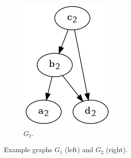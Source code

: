 \begin{frame}
\begin{figure}[htbp]
\begin{subfigure}[t]{0.19\textwidth}
			\includegraphics[width=\linewidth,valign=t]{inc/fuzzy_graph_theory/fuzzy_graph_morphism_G2.png}
			\caption{$G_2$.}
		\end{subfigure}
		\caption{Example graphs $G_1$ (left) and $G_2$ (right).}
	\end{figure}
\end{frame}

